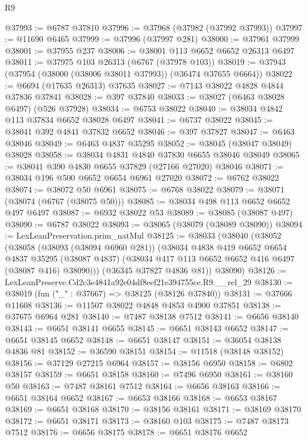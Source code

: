 \begin{lexlean}{R9}
\begin{coremodule}
@37993 := @6787 @37810
@37996 := @37968 (@37982 (@37992 @37993))
@37997 := @11690 @6465
@37999 := @37996 (@37997 @281)
@38000 := @37961 @37999
@38001 := @37955 @237
@38006 := @38001 @113 @6652 @6652 @26313 @6497
@38011 := @37975 @103 @26313 (@6767 (@37978 @103))
@38019 := @37943 (@37954 (@38000 (@38006 @38011 @37993)) (@36474 @37655 @6664))
@38022 := @6694 (@17635 @26313) @37635
@38027 := @7143 @38022 @4828 @4844 @37836 @37841
@38028 := @397 @37840
@38033 := @38027 (@6463 @38028 @6497) (@526 @37928)
@38034 := @6753 @38022
@38040 := @38034 @4842 @113 @37834 @6652 @38028 @6497
@38041 := @6737 @38022
@38045 := @38041 @392 @4841 @37832 @6652
@38046 := @397 @37827
@38047 := @6463 @38046
@38049 := @6463 @4837 @35295
@38052 := @38045 (@38047 @38049) @38028
@38058 := @38034 @4831 @4840 @37830 @6655 @38046 @38049
@38065 := @38041 @390 @4830 @6655 @37829 (@27166 @27020) @38046
@38071 := @38034 @196 @500 @6652 @6654 @6961 @27020
@38072 := @6762 @38022
@38074 := @38072 @50 @6961
@38075 := @6768 @38022
@38079 := @38071 (@38074 (@6767 (@38075 @50)))
@38085 := @38034 @498 @113 @6652 @6652 @497 @6497
@38087 := @6932 @38022 @53
@38089 := @38085 (@38087 @497)
@38090 := @6787 @38022
@38093 := @38065 (@38079 (@38089 @38090))
@38094 := LexLeanPreservation.prim_natMul
@38125 := @38033
    (@38040
      (@38052
        (@38058
          (@38093 (@38094 @6960 @281))
          (@38034
            @4838
            @419
            @6652
            @6654
            @4837
            @35295
            (@38087 @4837)
            (@38034 @417 @113 @6652 @6652 @416 @6497 (@38087 @416) @38090)))
        (@36345 @37827 @4836 @81))
      @38090)
@38126 := LexLeanPreserve.Cd2c3e4841a92e04df8eef21e394755ce.R9.__rel_29
@38130 := @38019 (fun ("_" : @37667) => @38125 (@38126 @37840))
@38131 := @37666 @11608
@38136 := @11507 @38022 @4848 @4853 @4900 @37851
@38138 := @37675 @6964 @281
@38140 := @7487 @38138 @7512
@38141 := @6656 @38140
@38143 := @6651 @38141 @6655
@38145 := @6651 @38143 @6652
@38147 := @6651 @38145 @6652
@38148 := @6651 @38147
@38151 := @36054 @38138 @4836 @81
@38152 := @36590 @38151
@38154 := @11518 (@38148 @38152)
@38156 := @37129 @27215 @6964
@38157 := @38156 @6950
@38158 := @6802 @38157
@38159 := @6651 @38158
@38160 := @7496 @6950
@38161 := @38160 @50
@38163 := @7487 @38161 @7512
@38164 := @6656 @38163
@38166 := @6651 @38164 @6652
@38167 := @6653 @38166
@38168 := @6653 @38167
@38169 := @6651 @38168
@38170 := @38156 @38161
@38171 := @38169 @38170
@38172 := @6651 @38171
@38173 := @38160 @103
@38175 := @7487 @38173 @7512
@38176 := @6656 @38175
@38178 := @6651 @38176 @6652

\end{coremodule}
\end{lexlean}

